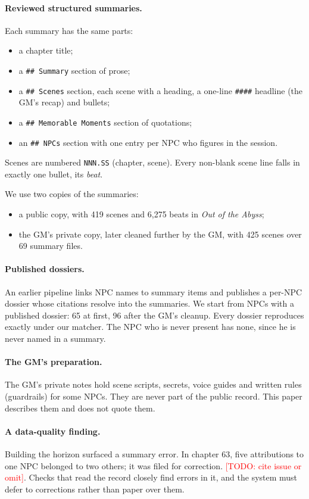 \documentclass[11pt]{article}
\newcommand{\todo}[1]{\textcolor{red}{[TODO: #1]}}
\newcommand{\code}[1]{\texttt{#1}}
\begin{document}
\paragraph{Reviewed structured summaries.}
Each summary has the same parts:
\begin{itemize}[nosep]
\item a chapter title;
\item a \code{\#\# Summary} section of prose;
\item a \code{\#\# Scenes} section, each scene with a heading, a one-line \code{\#\#\#\#}
headline (the GM's recap) and bullets;
\item a \code{\#\# Memorable Moments} section of quotations;
\item an \code{\#\# NPCs} section with one entry per NPC who figures in the session.
\end{itemize}
Scenes are numbered \code{NNN.SS} (chapter, scene). Every non-blank scene line falls
in exactly one bullet, its \emph{beat}.

We use two copies of the summaries:
\begin{itemize}[nosep]
\item a public copy, with 419 scenes and 6,275 beats in \emph{Out of the Abyss};
\item the GM's private copy, later cleaned further by the GM, with 425 scenes over 69
summary files.
\end{itemize}

\paragraph{Published dossiers.}
An earlier pipeline links NPC names to summary items and publishes a per-NPC dossier
whose citations resolve into the summaries. We start from NPCs with a published
dossier: 65 at first, 96 after the GM's cleanup. Every dossier reproduces exactly under
our matcher. The NPC who is never present has none, since he is never named in a
summary.

\paragraph{The GM's preparation.}
The GM's private notes hold scene scripts, secrets, voice guides and written rules
(guardrails) for some NPCs. They are never part of the public record. This paper
describes them and does not quote them.

\paragraph{A data-quality finding.}
Building the horizon surfaced a summary error. In chapter 63, five attributions to one
NPC belonged to two others; it was filed for correction. \todo{cite issue or omit}.
Checks that read the record closely find errors in it, and the system must defer to
corrections rather than paper over them.
\end{document}
